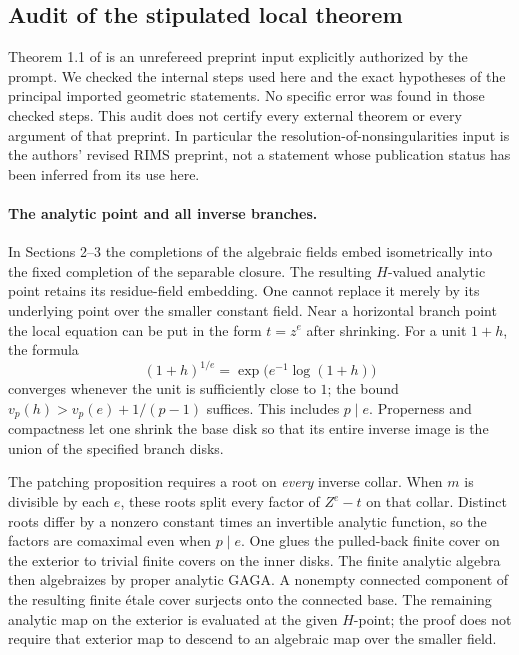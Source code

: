 \subsection*{Audit of the stipulated local theorem}

Theorem 1.1 of \cite{AgentOpenAILocal} is an unrefereed
preprint input explicitly authorized by the prompt. We checked
the internal steps used here and the exact hypotheses of the
principal imported geometric statements. No specific error was
found in those checked steps. This audit does not certify every
external theorem or every argument of that preprint. In
particular the resolution-of-nonsingularities input is the
authors' revised RIMS preprint, not a statement whose
publication status has been inferred from its use here.

\paragraph{The analytic point and all inverse branches.}
In Sections 2--3 the completions of the algebraic fields embed
isometrically into the fixed completion of the separable
closure. The resulting $H$-valued analytic point retains its
residue-field embedding. One cannot replace it merely by its
underlying point over the smaller constant field. Near a
horizontal branch point the local equation can be put in the
form $t=z^e$ after shrinking. For a unit $1+h$, the formula
\[
 (1+h)^{1/e}=\exp\bigl(e^{-1}\log(1+h)\bigr)
\]
converges whenever the unit is sufficiently close to $1$;
the bound $v_p(h)>v_p(e)+1/(p-1)$ suffices. This includes
$p\mid e$. Properness and compactness let one shrink the
base disk so that its entire inverse image is the union of
the specified branch disks.

The patching proposition requires a root on \emph{every}
inverse collar. When $m$ is divisible by each $e$, these
roots split every factor of $Z^e-t$ on that collar. Distinct
roots differ by a nonzero constant times an invertible
analytic function, so the factors are comaximal even when
$p\mid e$. One glues the pulled-back finite cover on the
exterior to trivial finite covers on the inner disks. The
finite analytic algebra then algebraizes by proper analytic
GAGA. A nonempty connected component of the resulting finite
\'etale cover surjects onto the connected base. The remaining
analytic map on the exterior is evaluated at the given
$H$-point; the proof does not require that exterior map to
descend to an algebraic map over the smaller field.

